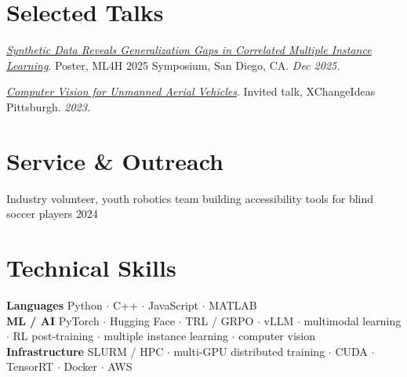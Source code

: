 \documentclass[10pt,letterpaper]{article}
\newcommand{\lffiguresnow}{\figureversion{lf}}
\newcommand{\lffiguresnow}{\addfontfeatures{Numbers=Lining}}
\newcommand{\sansfam}{\sffamily}
\newcommand{\datestamp}[1]{{\sansfam\footnotesize\color{meta}\lffiguresnow #1}}
\newenvironment{publist}{%
  \begin{list}{}{%
    \setlength{\leftmargin}{1.2em}%
    \setlength{\itemindent}{-1.2em}%
    \setlength{\itemsep}{2pt}%
    \setlength{\parsep}{0pt}%
    \setlength{\topsep}{1pt}%
  }%
}{\end{list}}
\begin{document}
\section{Selected Talks}

\begin{publist}
\item \href{https://drive.google.com/file/d/1Z6lkTsqYSIzOqgM53qONW2riQhVM5R0W/view?usp=sharing}{\textit{Synthetic Data Reveals Generalization Gaps in Correlated Multiple Instance Learning}}. Poster, ML4H 2025 Symposium, San Diego, CA. \textit{Dec 2025.}

\item \href{https://xchangepgh2023.sched.com/event/1LdC7/an-interactive-exploration-of-computer-vision-for-unmanned-aerial-vehicles-uavs}{\textit{Computer Vision for Unmanned Aerial Vehicles}}. Invited talk, XChangeIdeas Pittsburgh. \textit{2023.}
\end{publist}

\section{Service \& Outreach}

Industry volunteer, youth robotics team building accessibility tools for blind soccer players \hfill \datestamp{2024}

\section{Technical Skills}

\noindent\textbf{Languages} \quad Python $\cdot$ C++ $\cdot$ JavaScript $\cdot$ MATLAB \\
\textbf{ML / AI} \quad PyTorch $\cdot$ Hugging Face $\cdot$ TRL / GRPO $\cdot$ vLLM $\cdot$ multimodal learning $\cdot$ RL post-training $\cdot$ multiple instance learning $\cdot$ computer vision \\
\textbf{Infrastructure} \quad SLURM / HPC $\cdot$ multi-GPU distributed training $\cdot$ CUDA $\cdot$ TensorRT $\cdot$ Docker $\cdot$ AWS
\end{document}
